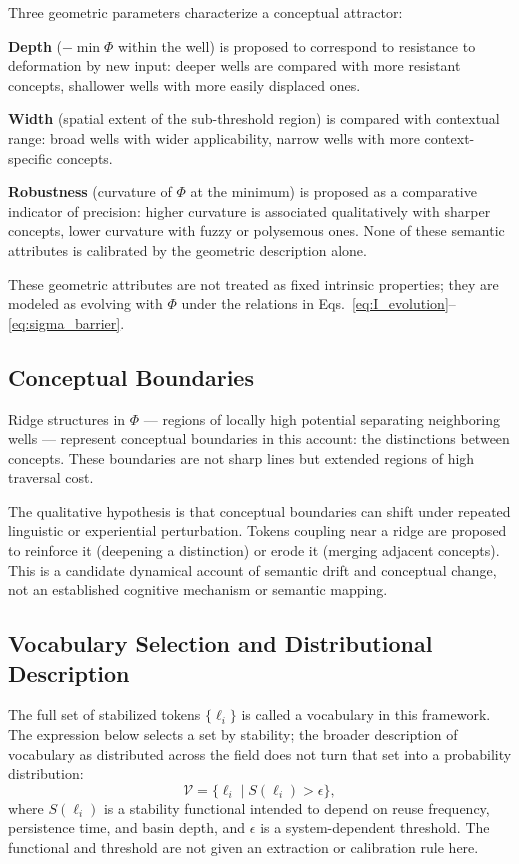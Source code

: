 Three geometric parameters characterize a conceptual attractor:

\textbf{Depth} ($-\min\Phi$ within the well) is proposed to correspond
to resistance to deformation by new input: deeper wells are compared with
more resistant concepts, shallower wells with more easily displaced ones.

\textbf{Width} (spatial extent of the sub-threshold region) is compared
with contextual range: broad wells with wider applicability, narrow wells
with more context-specific concepts.

\textbf{Robustness} (curvature of $\Phi$ at the minimum) is proposed
as a comparative indicator of precision: higher curvature is associated
qualitatively with sharper concepts, lower curvature with fuzzy or
polysemous ones. None of these semantic attributes is calibrated by
the geometric description alone.

These geometric attributes are not treated as fixed intrinsic properties;
they are modeled as evolving with $\Phi$ under the relations in
Eqs.~\eqref{eq:I_evolution}--\eqref{eq:sigma_barrier}.

\subsection{Conceptual Boundaries}

Ridge structures in $\Phi$ --- regions of locally high potential
separating neighboring wells --- represent conceptual boundaries in this
account: the distinctions between concepts.
These boundaries are not sharp lines but extended regions of high
traversal cost.

The qualitative hypothesis is that conceptual boundaries can shift under
repeated linguistic or experiential perturbation.
Tokens coupling near a ridge are proposed to reinforce it (deepening a
distinction) or erode it (merging adjacent concepts).
This is a candidate dynamical account of semantic drift and conceptual
change, not an established cognitive mechanism or semantic mapping.

\subsection{Vocabulary Selection and Distributional Description}

The full set of stabilized tokens $\{\ell_i\}$ is called a vocabulary
in this framework. The expression below selects a set by stability;
the broader description of vocabulary as distributed across the field
does not turn that set into a probability distribution:
\begin{equation}
  \mathcal{V} = \bigl\{\ell_i \;\big|\; S(\ell_i) > \epsilon \bigr\},
  \label{eq:vocabulary}
\end{equation}
where $S(\ell_i)$ is a stability functional intended to depend on reuse
frequency, persistence time, and basin depth, and $\epsilon$ is a
system-dependent threshold. The functional and threshold are not given
an extraction or calibration rule here.

